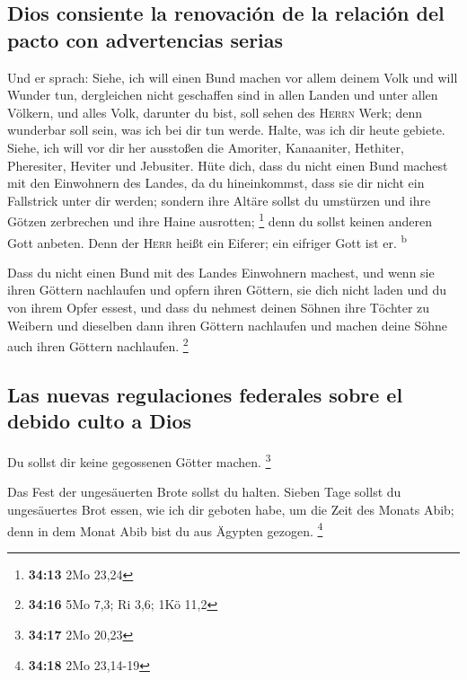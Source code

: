\hypertarget{dios-consiente-la-renovaciuxf3n-de-la-relaciuxf3n-del-pacto-con-advertencias-serias}{%
\subsection{Dios consiente la renovación de la relación del pacto con
advertencias
serias}\label{dios-consiente-la-renovaciuxf3n-de-la-relaciuxf3n-del-pacto-con-advertencias-serias}}

 Und er sprach: Siehe, ich will einen Bund machen vor
allem deinem Volk und will Wunder tun, dergleichen nicht geschaffen sind
in allen Landen und unter allen Völkern, und alles Volk, darunter du
bist, soll sehen des \textsc{Herrn} Werk; denn wunderbar soll sein, was
ich bei dir tun werde.  Halte, was ich dir heute gebiete.
Siehe, ich will vor dir her ausstoßen die Amoriter, Kanaaniter,
Hethiter, Pheresiter, Heviter und Jebusiter.  Hüte dich,
dass du nicht einen Bund machest mit den Einwohnern des Landes, da du
hineinkommst, dass sie dir nicht ein Fallstrick unter dir werden;
 sondern ihre Altäre sollst du umstürzen und ihre Götzen
zerbrechen und ihre Haine ausrotten; \footnote{\textbf{34:13} 2Mo 23,24}
 denn du sollst keinen anderen Gott anbeten. Denn der
\textsc{Herr} heißt ein Eiferer; ein eifriger Gott ist er.
\textsuperscript{b}

 Dass du nicht einen Bund mit des Landes Einwohnern
machest, und wenn sie ihren Göttern nachlaufen und opfern ihren Göttern,
sie dich nicht laden und du von ihrem Opfer essest,  und
dass du nehmest deinen Söhnen ihre Töchter zu Weibern und dieselben dann
ihren Göttern nachlaufen und machen deine Söhne auch ihren Göttern
nachlaufen. \footnote{\textbf{34:16} 5Mo 7,3; Ri 3,6; 1Kö 11,2}

\hypertarget{las-nuevas-regulaciones-federales-sobre-el-debido-culto-a-dios}{%
\subsection{Las nuevas regulaciones federales sobre el debido culto a
Dios}\label{las-nuevas-regulaciones-federales-sobre-el-debido-culto-a-dios}}

 Du sollst dir keine gegossenen Götter machen.
\footnote{\textbf{34:17} 2Mo 20,23}

 Das Fest der ungesäuerten Brote sollst du halten. Sieben
Tage sollst du ungesäuertes Brot essen, wie ich dir geboten habe, um die
Zeit des Monats Abib; denn in dem Monat Abib bist du aus Ägypten
gezogen. \footnote{\textbf{34:18} 2Mo 23,14-19}

